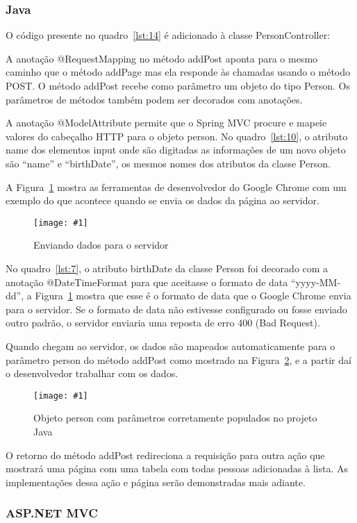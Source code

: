 \documentclass[a4paper,12pt]{article}
\newcommand{\figura}[3] {
	\begin{figure}[ht]
		\centering
		\texttt{[image: \#1]}
		\caption{#2}
		\label{#3}
	\end{figure}
	\FloatBarrier
}
\newcommand{\javacode}[3] {
	
}
\begin{document}
\subsubsection{Java}

O código presente no quadro~\ref{lst:14} é adicionado à classe PersonController:

\javacode{code/14.txt}{Ação de PersonController no projeto Java que responde ao método POST}{lst:14}

A anotação @RequestMapping no método addPost aponta para o mesmo caminho que o método addPage mas ela responde às chamadas usando o método POST. O método addPost recebe como parâmetro um objeto do tipo Person. Os parâmetros de métodos também podem ser decorados com anotações.

A anotação @ModelAttribute permite que o Spring MVC procure e mapeie valores do cabeçalho HTTP para o objeto person. No quadro~\ref{lst:10}, o atributo name dos elementos input onde são digitadas as informações de um novo objeto são “name” e “birthDate”, os mesmos nomes dos atributos da classe Person.

A Figura~\ref{fig:29} mostra as ferramentas de desenvolvedor do Google Chrome com um exemplo do que acontece quando se envia os dados da página ao servidor.

\figura{29.png}{Enviando dados para o servidor}{fig:29}

No quadro~\ref{lst:7}, o atributo birthDate da classe Person foi decorado com a anotação @DateTimeFormat para que aceitasse o formato de data “yyyy-MM-dd”, a Figura~\ref{fig:29} mostra que esse é o formato de data que o Google Chrome envia para o servidor. Se o formato de data não estivesse configurado ou fosse enviado outro padrão, o servidor enviaria uma reposta de erro 400 (Bad Request).

Quando chegam ao servidor, os dados são mapeados automaticamente para o parâmetro person do método addPost como mostrado na Figura~\ref{fig:30}, e a partir daí o desenvolvedor trabalhar com os dados.

\figura{30.png}{Objeto person com parâmetros corretamente populados no projeto Java}{fig:30}

O retorno do método addPost redireciona a requisição para outra ação que mostrará uma página com uma tabela com todas pessoas adicionadas à lista. As implementações dessa ação e página serão demonstradas mais adiante.

\subsubsection{ASP.NET MVC}
\end{document}
